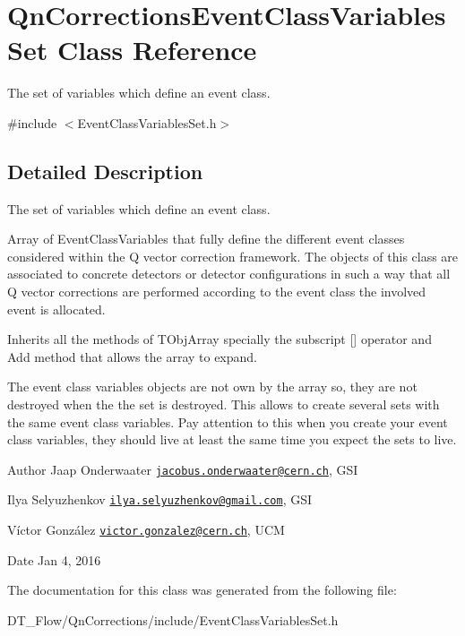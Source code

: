 \hypertarget{classQnCorrectionsEventClassVariablesSet}{}\section{Qn\+Corrections\+Event\+Class\+Variables\+Set Class Reference}
\label{classQnCorrectionsEventClassVariablesSet}


The set of variables which define an event class.  




{\ttfamily \#include $<$Event\+Class\+Variables\+Set.\+h$>$}



\subsection{Detailed Description}
The set of variables which define an event class. 

Array of Event\+Class\+Variables that fully define the different event classes considered within the Q vector correction framework. The objects of this class are associated to concrete detectors or detector configurations in such a way that all Q vector corrections are performed according to the event class the involved event is allocated.

Inherits all the methods of T\+Obj\+Array specially the subscript \mbox{[}\mbox{]} operator and Add method that allows the array to expand.

The event class variables objects are not own by the array so, they are not destroyed when the the set is destroyed. This allows to create several sets with the same event class variables. Pay attention to this when you create your event class variables, they should live at least the same time you expect the sets to live.

\begin{DoxyAuthor}{Author}
Jaap Onderwaater \href{mailto:jacobus.onderwaater@cern.ch}{\tt jacobus.\+onderwaater@cern.\+ch}, G\+SI 

Ilya Selyuzhenkov \href{mailto:ilya.selyuzhenkov@gmail.com}{\tt ilya.\+selyuzhenkov@gmail.\+com}, G\+SI 

Víctor González \href{mailto:victor.gonzalez@cern.ch}{\tt victor.\+gonzalez@cern.\+ch}, U\+CM 
\end{DoxyAuthor}
\begin{DoxyDate}{Date}
Jan 4, 2016 
\end{DoxyDate}


The documentation for this class was generated from the following file\+:\begin{DoxyCompactItemize}
\item 
D\+T\+\_\+\+Flow/\+Qn\+Corrections/include/Event\+Class\+Variables\+Set.\+h\end{DoxyCompactItemize}
